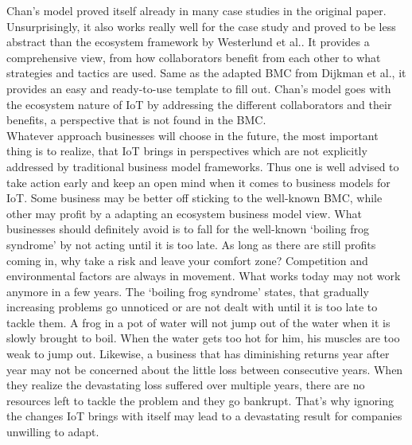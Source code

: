 		Chan's model proved itself already in many case studies in the original paper. Unsurprisingly, it also works really well for the case study and proved to be less abstract than the ecosystem framework by Westerlund et al.. It provides a comprehensive view, from how collaborators benefit from each other to what strategies and tactics are used. Same as the adapted BMC from Dijkman et al., it provides an easy and ready-to-use template to fill out. Chan's model goes with the ecosystem nature of IoT by addressing the different collaborators and their benefits, a perspective that is not found in the BMC.\\
		Whatever approach businesses will choose in the future, the most important thing is to realize, that IoT brings in perspectives which are not explicitly addressed by traditional business model frameworks. Thus one is well advised to take action early and keep an open mind when it comes to business models for IoT. Some business may be better off sticking to the well-known BMC, while other may profit by a adapting an ecosystem business model view. What businesses should definitely avoid is to fall for the well-known `boiling frog syndrome' by not acting until it is too late. As long as there are still profits coming in, why take a risk and leave your comfort zone? Competition and environmental factors are always in movement. What works today may not work anymore in a few years. The `boiling frog syndrome' states, that gradually increasing problems go unnoticed or are not dealt with until it is too late to tackle them. A frog in a pot of water will not jump out of the water when it is slowly brought to boil. When the water gets too hot for him, his muscles are too weak to jump out. Likewise, a business that has diminishing returns year after year may not be concerned about the little loss between consecutive years. When they realize the devastating loss suffered over multiple years, there are no resources left to tackle the problem and they go bankrupt. That's why ignoring the changes IoT brings with itself may lead to a devastating result for companies unwilling to adapt.
\vspace{-2em}
